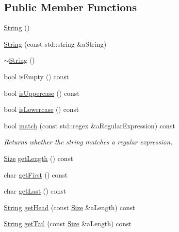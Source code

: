 \subsection*{Public Member Functions}
\begin{DoxyCompactItemize}
\item 
\hyperlink{classlibrary_1_1core_1_1types_1_1_string_ab49dec039a75f0049c95759141b6d484}{String} ()
\item 
\hyperlink{classlibrary_1_1core_1_1types_1_1_string_a37c737528805786c49eab397ba7b64ae}{String} (const std\+::string \&a\+String)
\item 
\hyperlink{classlibrary_1_1core_1_1types_1_1_string_a97f9b0024a58372a0281b25e2811f3bf}{$\sim$\+String} ()
\item 
bool \hyperlink{classlibrary_1_1core_1_1types_1_1_string_a1981fee5619389b46c786afa7aadc251}{is\+Empty} () const
\item 
bool \hyperlink{classlibrary_1_1core_1_1types_1_1_string_a6d12c373b22a062cfa0270204fc998f5}{is\+Uppercase} () const
\item 
bool \hyperlink{classlibrary_1_1core_1_1types_1_1_string_a3620d335dd5b14029a3a67e75c79be81}{is\+Lowercase} () const
\item 
bool \hyperlink{classlibrary_1_1core_1_1types_1_1_string_abab50e9c0d620b246d0bfde0dad0add5}{match} (const std\+::regex \&a\+Regular\+Expression) const
\begin{DoxyCompactList}\small\item\em Returns whether the string matches a regular expression. \end{DoxyCompactList}\item 
\hyperlink{namespacelibrary_1_1core_1_1types_a701626ea1027888ebbb8cfd0ff7adab0}{Size} \hyperlink{classlibrary_1_1core_1_1types_1_1_string_adc97f82ccc9a3d034bc3127e643199fb}{get\+Length} () const
\item 
char \hyperlink{classlibrary_1_1core_1_1types_1_1_string_ad695264b765448ecf4f8617553012eee}{get\+First} () const
\item 
char \hyperlink{classlibrary_1_1core_1_1types_1_1_string_aae3aaf5e3b3fde3f7b90fd1ee431c9d4}{get\+Last} () const
\item 
\hyperlink{classlibrary_1_1core_1_1types_1_1_string}{String} \hyperlink{classlibrary_1_1core_1_1types_1_1_string_af11475f7a147a11342765a690df18852}{get\+Head} (const \hyperlink{namespacelibrary_1_1core_1_1types_a701626ea1027888ebbb8cfd0ff7adab0}{Size} \&a\+Length) const
\item 
\hyperlink{classlibrary_1_1core_1_1types_1_1_string}{String} \hyperlink{classlibrary_1_1core_1_1types_1_1_string_ac1c579d8fe140ab627b679e1d372746a}{get\+Tail} (const \hyperlink{namespacelibrary_1_1core_1_1types_a701626ea1027888ebbb8cfd0ff7adab0}{Size} \&a\+Length) const

\end{DoxyCompactItemize}
